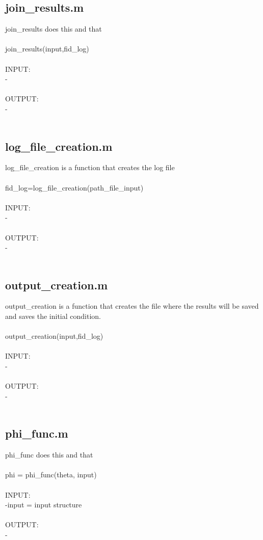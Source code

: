\subsection{join\_results.m}
join\_results does this and that \\ 
 \\ 
join\_results(input,fid\_log) \\ 
 \\ 
INPUT: \\ 
   - \\ 
 \\ 
OUTPUT: \\ 
   - \\ 
 \\ 
\subsection{log\_file\_creation.m}
log\_file\_creation is a function that creates the log file \\ 
 \\ 
fid\_log=log\_file\_creation(path\_file\_input) \\ 
 \\ 
INPUT: \\ 
   - \\ 
 \\ 
OUTPUT: \\ 
   - \\ 
 \\ 
\subsection{output\_creation.m}
output\_creation is a function that creates the file where the results will be saved and saves the initial condition. \\ 
 \\ 
output\_creation(input,fid\_log) \\ 
 \\ 
INPUT: \\ 
   - \\ 
 \\ 
OUTPUT: \\ 
   - \\ 
 \\ 
\subsection{phi\_func.m}
phi\_func does this and that \\ 
 \\ 
phi = phi\_func(theta, input) \\ 
 \\ 
INPUT: \\ 
   -input = input structure \\ 
 \\ 
OUTPUT: \\ 
   - \\ 
 \\ 
